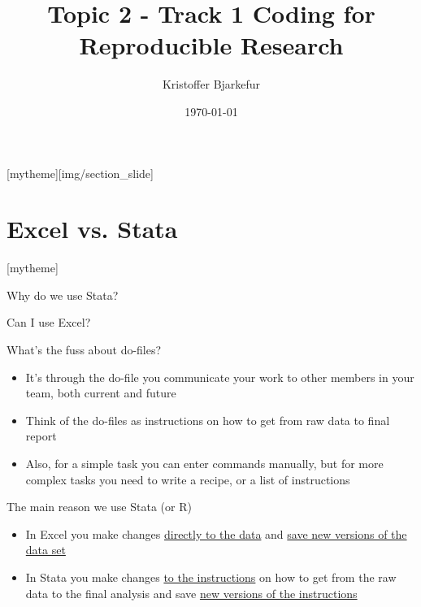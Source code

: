 \documentclass[aspectratio=169]{beamer}
\title{Topic 2 - Track 1 \newline Coding for Reproducible Research}
\date{\today}
\author{Kristoffer Bjarkefur} %
\institute{Development Impact Evaluation (DIME) \newline The World Bank }
\newcommand{\sectionpic}[2]{
	\setbeamertemplate{section page}[mytheme][#2]
	\section{#1}
	\setbeamertemplate{section page}[mytheme]
}
\begin{document}
	
{
	\maketitle
}

\sectionpic{Excel vs. Stata}{img/section_slide}


\begin{frame}{Why do we use Stata?}
\begin{center}
	\huge Can I use Excel? 
\end{center}

\end{frame}


\begin{frame}{What's the fuss about do-files?}

\begin{itemize}
	\item It’s through the do-file you communicate your work to other members in your team, both current and future

	\item Think of the do-files as instructions on how to get from raw data to final report

	\item Also, for a simple task you can enter commands manually, but for more complex tasks you need to write a recipe, or a list of instructions

\end{itemize}
\end{frame}

\begin{frame}{The main reason we use Stata (or R)}
\begin{itemize}
	
	\item In Excel you make changes \underline{directly to the data} and \underline{save new versions of the data set}

	\item In Stata you make changes \underline{to the instructions} on how to get from the raw data to the final analysis and save \underline{new versions of the instructions}
\end{itemize}
\end{frame}
\end{document}

